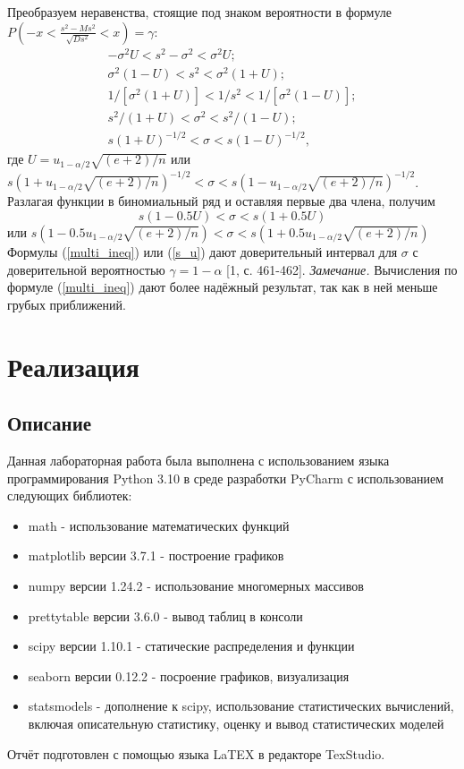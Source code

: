 \documentclass[a4paper,14pt]{article}
\begin{document}
	Преобразуем неравенства, стоящие под знаком вероятности в формуле
	\newline
	$P\left(-x < \frac{s^{2}-Ms^{2}}{\sqrt{D s^{2}}} < x\right) = \gamma$:
	\begin{equation}
		\begin{split}
			-\sigma^{2}U < s^{2} -\sigma^{2} < \sigma^{2}U; \\
			\sigma^{2}(1-U) < s^{2} < \sigma^{2}(1 + U); \\
			1/[\sigma^{2}(1 + U)] < 1/s^{2} < 1/[\sigma^{2}(1-U)];\\
			s^{2}/(1 + U) < \sigma^{2} < s^{2}/(1-U);\\
			s(1 + U)^{-1/2} < \sigma < s(1-U)^{-1/2},
		\end{split}
		\label{multi_ineq}
	\end{equation}
	где $U = u_{1-\alpha/2}\sqrt{{(e + 2)}/n}$ или
	\newline
	$s(1 +  u_{1-\alpha/2}\sqrt{(e + 2)/n})^{-1/2} <\sigma < s(1-u_{1-\alpha/2}\sqrt{(e + 2)/n})^{-1/2}$.
	\newline
	Разлагая функции в биномиальный ряд и оставляя первые два члена, получим
	\begin{equation}
		s(1-0.5U) < \sigma < s(1 + 0.5U)
		\label{s_U}
	\end{equation}
	или
	$s(1-0.5u_{1-\alpha/2}\sqrt{(e + 2)/n}) < \sigma < s(1 + 0.5 u_{1-\alpha/2}\sqrt{(e + 2)/n})$
	Формулы (\ref{multi_ineq}) или (\ref{s_u}) дают доверительный интервал для $\sigma$ с доверительной вероятностью $\gamma = 1-\alpha$ [1, с. 461-462]. 
	\newline
	\textit{Замечание.} Вычисления по формуле (\ref{multi_ineq}) дают более надёжный результат, так как в ней меньше грубых приближений.
	\section{Реализация}
	\subsection{Описание}
	Данная лабораторная работа была выполнена с использованием языка
	программирования Python 3.10 в среде разработки PyCharm с
	использованием следующих библиотек:
	\begin{itemize}
		\item math - использование математических функций
		\item matplotlib версии 3.7.1 - построение графиков
		\item numpy версии 1.24.2 - использование многомерных массивов
		\item prettytable версии 3.6.0 - вывод таблиц в консоли 
		\item scipy версии 1.10.1 - статические распределения и функции
		\item seaborn версии 0.12.2 - посроение графиков, визуализация
		\item statsmodels - дополнение к scipy, использование статистических вычислений, включая описательную статистику, оценку и вывод статистических моделей
	\end{itemize}
	Отчёт подготовлен с помощью языка LaTEX в редакторе TexStudio.
\end{document}
